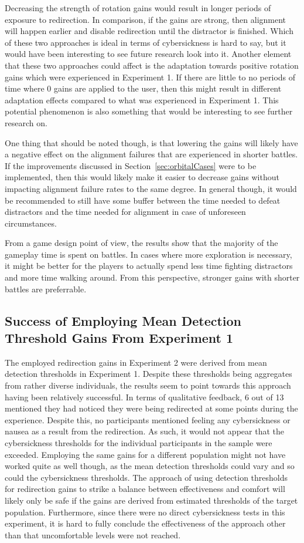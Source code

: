 Decreasing the strength of rotation gains would result in longer periods of exposure to redirection. In comparison, if the gains are strong, then alignment will happen earlier and disable redirection until the distractor is finished. Which of these two approaches is ideal in terms of cybersickness is hard to say, but it would have been interesting to see future research look into it. Another element that these two approaches could affect is the adaptation towards positive rotation gains which were experienced in Experiment 1. If there are little to no periods of time where 0 gains are applied to the user, then this might result in different adaptation effects compared to what was experienced in Experiment 1. This potential phenomenon is also something that would be interesting to see further research on.

One thing that should be noted though, is that lowering the gains will likely have a negative effect on the alignment failures that are experienced in shorter battles. If the improvements discussed in Section~\ref{sec:orbitalCases} were to be implemented, then this would likely make it easier to decrease gains without impacting alignment failure rates to the same degree. In general though, it would be recommended to still have some buffer between the time needed to defeat distractors and the time needed for alignment in case of unforeseen circumstances.
   
From a game design point of view, the results show that the majority of the gameplay time is spent on battles. In cases where more exploration is necessary, it might be better for the players to actually spend less time fighting distractors and more time walking around. From this perspective, stronger gains with shorter battles are preferrable. 
   
\subsection{Success of Employing Mean Detection Threshold Gains From Experiment 1}
The employed redirection gains in Experiment 2 were derived from mean detection thresholds in Experiment 1. Despite these thresholds being aggregates from rather diverse individuals, the results seem to point towards this approach having been relatively successful. In terms of qualitative feedback, 6 out of 13 mentioned they had noticed they were being redirected at some points during the experience. Despite this, no participants mentioned feeling any cybersickness or nausea as a result from the redirection. As such, it would not appear that the cybersickness thresholds for the individual participants in the sample were exceeded. Employing the same gains for a different population might not have worked quite as well though, as the mean detection thresholds could vary and so could the cybersickness thresholds. The approach of using detection thresholds for redirection gains to strike a balance between effectiveness and comfort will likely only be safe if the gains are derived from estimated thresholds of the target population. Furthermore, since there were no direct cybersickness tests in this experiment, it is hard to fully conclude the effectiveness of the approach other than that uncomfortable levels were not reached.  

